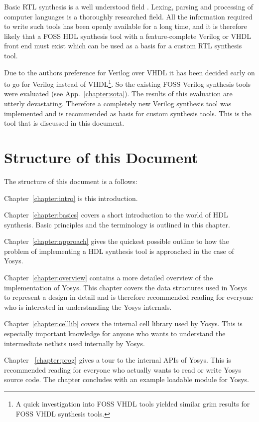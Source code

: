 Basic RTL synthesis is a well understood field \cite{LogicSynthesis}. Lexing,
parsing and processing of computer languages \cite{Dragonbook} is a thoroughly
researched field. All the information required to write such tools has been openly
available for a long time, and it is therefore likely that a FOSS HDL synthesis tool
with a feature-complete Verilog or VHDL front end must exist which can be used as a basis for a custom RTL synthesis tool.

Due to the authors preference for Verilog over VHDL it has been decided early
on to go for Verilog instead of VHDL\footnote{A quick investigation into FOSS
VHDL tools yielded similar grim results for FOSS VHDL synthesis tools.}.
So the existing FOSS Verilog synthesis tools were evaluated (see
App.~\ref{chapter:sota}).  The results of this evaluation are utterly
devastating. Therefore a completely new Verilog synthesis tool was implemented
and is recommended as basis for custom synthesis tools. This is the tool that
is discussed in this document.

\section{Structure of this Document}

The structure of this document is a follows:

Chapter~\ref{chapter:intro} is this introduction.

Chapter~\ref{chapter:basics} covers a short introduction to the world of HDL
synthesis. Basic principles and the terminology is outlined in this chapter.

Chapter~\ref{chapter:approach} gives the quickest possible outline to how the
problem of implementing a HDL synthesis tool is approached in the case of
Yosys.

Chapter~\ref{chapter:overview} contains a more detailed overview of the
implementation of Yosys. This chapter covers the data structures used in 
Yosys to represent a design in detail and is therefore recommended reading
for everyone who is interested in understanding the Yosys internals.

Chapter~\ref{chapter:celllib} covers the internal cell library used by Yosys.
This is especially important knowledge for anyone who wants to understand the
intermediate netlists used internally by Yosys.

Chapter~ \ref{chapter:prog} gives a tour to the internal APIs of Yosys. This
is recommended reading for everyone who actually wants to read or write
Yosys source code. The chapter concludes with an example loadable module
for Yosys.

